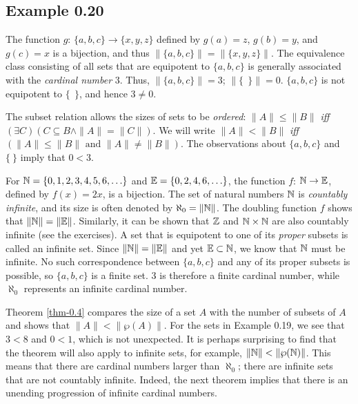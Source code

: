 \subsection*{Example 0.20}

The function $g$: $\{a,b,c\}\rightarrow\{x,y,z\}$ defined by $g(a)=z$, $g(b)=y$,
and $g(c)=x$ is a bijection, and thus $\|\{a,b,c\}\|=\|\{x,y,z\}\|$. The
equivalence class consisting of all sets that are equipotent to $\{a,b,c\}$ is
generally associated with the \emph{cardinal number} 3. Thus, $\|\{a,b,c\}\| =
3$; $\|\{\ \ \}\|=0$. $\{a,b,c\}$ is not equipotent to $\{\ \ \}$, and hence $3
\not= 0$.

The subset relation allows the sizes of sets to be \emph{ordered}:
$\|A\| \leq \|B\|$ \emph{iff} $(\exists C)(C \subseteq B \wedge \|A\| = \|C\|)$.
We will write 
$\|A\| < \|B\|$ \emph{iff} $(\|A\| \leq \|B\|\text{ and }\|A\| \not= \|B\|)$.
The observations about $\{a,b,c\}$ and $\{\ \}$ imply that $0 < 3$.

For $\mathbb{N} =\{0,1,2,3,4,5,6, \ldots \}$ and $\mathbb{E} =\{0,2,4,6, \ldots \}$, the
function $f$: $\mathbb{N} \rightarrow \mathbb{E}$, defined by $f(x) = 2x$, is a bijection. The
set of natural numbers $\mathbb{N}$ is \emph{countably infinite}, and its size is often
denoted by $\aleph_0= \|\mathbb{N}\|$. The doubling function $f$ shows that
$\|\mathbb{N}\| = \|\mathbb{E}\|$. Similarly, it can be shown that $\mathbb{Z}$ and $\mathbb{N} \times \mathbb{N}$
are also countably infinite (see the exercises). A set that is equipotent to one
of its \emph{proper} subsets is called an infinite set. Since $\|\mathbb{N}\| = \|\mathbb{E}\|$ and
yet $\mathbb{E} \subset \mathbb{N}$, we know that $\mathbb{N}$ must be infinite. No such
correspondence between $\{a,b,c\}$ and any of its proper subsets is possible, so
$\{a,b,c\}$ is a finite set. 3 is therefore a finite cardinal number, while
$\aleph_0$ represents an infinite cardinal number.

Theorem \ref{thm-0.4} compares the size of a set $A$ with the number of subsets of $A$ and
shows that $\|A\| < \|\wp(A)\|$. For the sets in Example 0.19, we see that
$3 < 8$ and $0 < 1$, which is not unexpected. It is perhaps surprising to find
that the theorem will also apply to infinite sets, for example,
$\|\mathbb{N}\| < \|\wp(\mathbb{N})\|$. This means that there are cardinal numbers larger
than $\aleph_0$; there are infinite sets that are not countably infinite.
Indeed, the next theorem implies that there is an unending progression of
infinite cardinal numbers.

